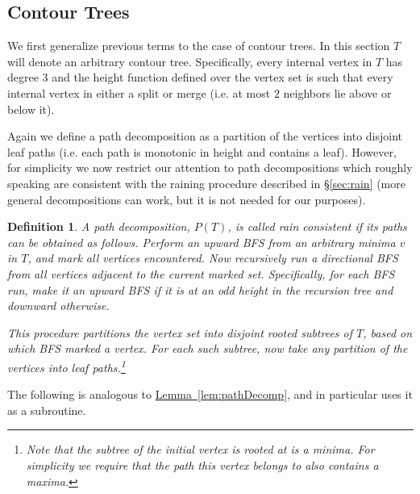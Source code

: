 \documentclass[11pt]{article}
\newtheorem{definition}[theorem]{Definition}
\theoremstyle{definition}
\newcommand{\Sec}[1]{\hyperref[sec:#1]{\S\ref*{sec:#1}}} %
\newcommand{\Lem}[1]{\hyperref[lem:#1]{Lemma~\ref*{lem:#1}}} %
\begin{document}
\subsection{Contour Trees}
We first generalize previous terms to the case of contour trees.
In this section $T$ will denote an arbitrary contour tree.  Specifically, every internal vertex in $T$ has degree $3$ 
and the height function defined over the vertex set is such that every internal vertex in either a split or merge 
(i.e. at most $2$ neighbors lie above or below it).

Again we define a path decomposition as a partition of the vertices into 
disjoint leaf paths (i.e. each path is monotonic in height and contains a leaf). 
However, for simplicity we now restrict our attention to path decompositions which 
roughly speaking are consistent with the raining procedure described in \Sec{rain} 
(more general decompositions can work, but it is not needed for our purposes).

\begin{definition}
\label{def:path2} A path decomposition, $P(T)$, is called \emph{rain consistent} if its paths can be obtained as follows.
Perform an upward BFS from an arbitrary minima $v$ in $T$, and mark all vertices encountered.  
Now recursively run a directional BFS from all vertices adjacent to the current marked set.  
Specifically, for each BFS run, make it an upward BFS if it is at an odd height in the recursion tree and downward otherwise.  

This procedure partitions the vertex set into disjoint rooted subtrees of $T$, based on which BFS marked a vertex.  
For each such subtree, now take any partition of the vertices into leaf paths.\footnote{Note that the subtree  
of the initial vertex is rooted at is a minima.  For simplicity we require that the path this vertex belongs to 
also contains a maxima.}
\end{definition}


The following is analogous to \Lem{pathDecomp}, and in particular uses it as a subroutine.
\end{document}
